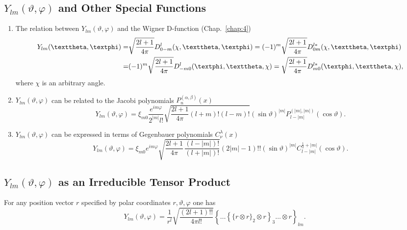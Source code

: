 \subsection{$Y_{l m}(\vartheta, \varphi)$ and Other Special Functions}\label{sec:5.2.7}
\begin{enumerate}[label=(\alph*)]
\item The relation between $Y_{l m}(\vartheta, \varphi)$ and the Wigner D-function (Chap.~\ref{chap:4})
\begin{align}
Y_{l m}(\vartheta, \varphi)=&\sqrt{\frac{2 l+1}{4 \pi}} D_{0-m}^{l}(\chi, \vartheta, \varphi)=(-1)^{m} \sqrt{\frac{2 l+1}{4 \pi}} D_{0 m}^{l *}(\chi, \vartheta, \varphi)  \notag\\
=&(-1)^{m} \sqrt{\frac{2 l+1}{4 \pi}} D_{-m 0}^{l}(\varphi, \vartheta, \chi)=\sqrt{\frac{2 l+1}{4 \pi}} D_{m 0}^{l *}(\varphi, \vartheta, \chi) ,\label{eq:5:2:37}
\end{align}
where $\chi$ is an arbitrary angle.\\
\item $Y_{l m}(\vartheta, \varphi)$ can be related to the Jacobi polynomials $P_{n}^{(\alpha, \beta)}(x)$
\begin{equation}
Y_{l m}(\vartheta, \varphi)=\xi_{m 0} \frac{e^{i m \varphi}}{2^{|m|} l!} \sqrt{\frac{2 l+1}{4 \pi}(l+m)!(l-m)!}(\sin \vartheta)^{|m|} P_{l-|m|}^{(|m|,|m|)}(\cos \vartheta) .\label{eq:5:2:38}
\end{equation}
\item $Y_{l m}(\vartheta, \varphi)$ can be expressed in terms of Gegenbauer polynomials $C_{\nu}^{\lambda}(x)$
\begin{equation}
Y_{l m}(\vartheta, \varphi)=\xi_{m 0} e^{i m \varphi} \sqrt{\frac{2 l+1}{4 \pi} \, \frac{(l-|m|)!}{(l+|m|)!}}(2|m|-1)!!(\sin \vartheta)^{|m|} C_{l-|m|}^{\frac{1}{2}+|m|}(\cos \vartheta) .\label{eq:5:2:39}
\end{equation}
\end{enumerate}

\subsection{$Y_{l m}(\vartheta, \varphi)$ as an Irreducible Tensor Product}\label{sec:5.2.8}
For any position vector $r$ specified by polar coordinates $r, \vartheta, \varphi$ one has
\begin{equation}
Y_{l m}(\vartheta, \varphi)=\frac{1}{r^{l}} \sqrt{\frac{(2 l+1)!!}{4 \pi l!}}\left\{\ldots\left\{\{r \otimes r\}_{2} \otimes r\right\}_{3} \ldots \otimes r\right\}_{l m} .\label{eq:5:2:40}
\end{equation}
